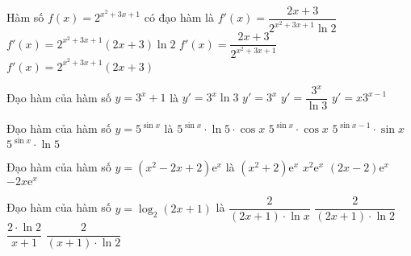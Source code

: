 \begin{ex}%
	Hàm số $ f( x )={2^{{x^2}+3x+1}}$ có đạo hàm là
	\choice
	{ $f'( x )=\dfrac{2x+3}{{2^{{x^2}+3x+1}}\ln 2}$}
	{\True $f'( x )={2^{{x^2}+3x+1}}( 2x+3 )\ln 2$}
	{ $f'( x )=\dfrac{2x+3}{{2^{{x^2}+3x+1}}}$}
	{ $f'( x )={2^{{x^2}+3x+1}}( 2x+3 )$}
\end{ex}
\begin{ex}%
	Đạo hàm của hàm số $ y={3^x}+1$ là
	\choice
	{\True $y'={3^x}\ln 3$}
	{ $y'={3^x}$}
	{ $y'=\dfrac{{3^x}}{\ln 3}$}
	{ $y'=x{3^{x-1}}$}
\end{ex}

\begin{ex}%
	Đạo hàm của hàm số $y=5^{\sin x}$ là
	\choice
	{\True $5^{\sin x} \cdot \ln 5 \cdot \cos x$}
	{$5^{\sin x}\cdot\cos x$}
	{ $5^{\sin x - 1}\cdot\sin x$}
	{$5^{\sin x}\cdot\ln 5$}
\end{ex}

\begin{ex}%
	Đạo hàm của hàm số $y=\left(x^2 - 2x + 2\right) \mathrm{e}^x$ là
	\choice
	{$\left(x^2 + 2\right) \mathrm{e}^x$}
	{\True $x^2\mathrm{e}^x$}
	{$(2x - 2) \mathrm{e}^x$}
	{$ - 2x \mathrm{e}^x$}
\end{ex}

\begin{ex}%
	Đạo hàm của hàm số $y=\log_2\left(2x+1\right)$ là
	\choice
	{$\dfrac{2}{\left(2x+1\right)\cdot\ln x}$}
	{\True $\dfrac{2}{\left(2x+1\right)\cdot\ln 2}$}
	{$\dfrac{2\cdot\ln 2}{x+1}$}
	{$\dfrac{2}{\left(x+1\right)\cdot\ln 2}$}
\end{ex}

